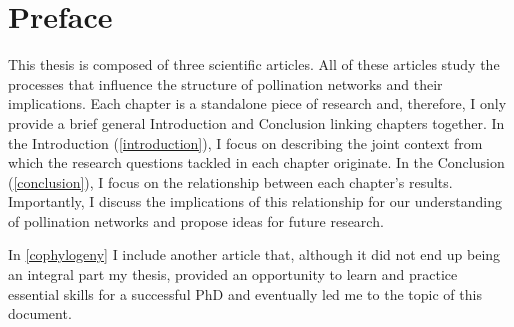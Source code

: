 
{}
\chapter*{Preface}

\manualmark
{}

\noindent This thesis is composed of three scientific articles.
All of these articles study the processes that influence the structure of pollination networks and their implications.
Each chapter is a standalone piece of research and, therefore, I only provide a brief general Introduction and Conclusion linking chapters together.
In the Introduction (\autoref{introduction}), I focus on describing the joint context from which the research questions tackled in each chapter originate.
In the Conclusion (\autoref{conclusion}), I focus on the relationship between each chapter's results.
Importantly, I discuss the implications of this relationship for our understanding of pollination networks and propose ideas for future research.

In \autoref{cophylogeny} I include another article that, although it did not end up being an integral part my thesis, provided an opportunity to learn and practice essential skills for a successful PhD and eventually led me to the topic of this document.

\vfill
